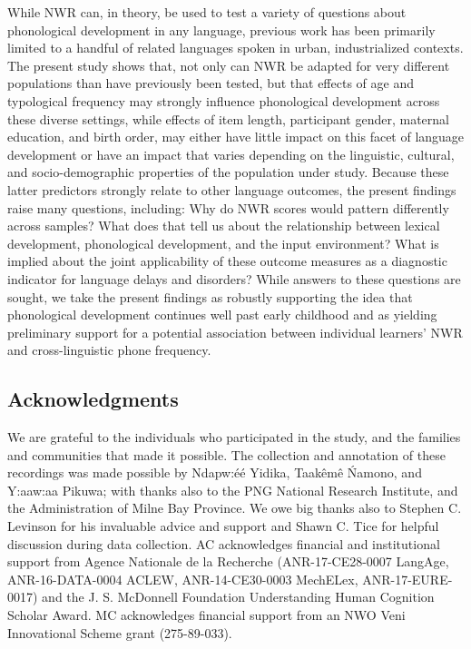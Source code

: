 \documentclass[english,,man,floatsintext]{apa6}
\begin{document}
While NWR can, in theory, be used to test a variety of questions about phonological development in any language, previous work has been primarily limited to a handful of related languages spoken in urban, industrialized contexts. The present study shows that, not only can NWR be adapted for very different populations than have previously been tested, but that effects of age and typological frequency may strongly influence phonological development across these diverse settings, while effects of item length, participant gender, maternal education, and birth order, may either have little impact on this facet of language development or have an impact that varies depending on the linguistic, cultural, and socio-demographic properties of the population under study. Because these latter predictors strongly relate to other language outcomes, the present findings raise many questions, including: Why do NWR scores would pattern differently across samples? What does that tell us about the relationship between lexical development, phonological development, and the input environment? What is implied about the joint applicability of these outcome measures as a diagnostic indicator for language delays and disorders? While answers to these questions are sought, we take the present findings as robustly supporting the idea that phonological development continues well past early childhood and as yielding preliminary support for a potential association between individual learners' NWR and cross-linguistic phone frequency.

\newpage

\hypertarget{acknowledgments}{%
\subsection{Acknowledgments}\label{acknowledgments}}

We are grateful to the individuals who participated in the study, and the families and communities that made it possible. The collection and annotation of these recordings was made possible by Ndapw:éé Yidika, Taakêmê Ńamono, and Y:aaw:aa Pikuwa; with thanks also to the PNG National Research Institute, and the Administration of Milne Bay Province. We owe big thanks also to Stephen C. Levinson for his invaluable advice and support and Shawn C. Tice for helpful discussion during data collection. AC acknowledges financial and institutional support from Agence Nationale de la Recherche (ANR-17-CE28-0007 LangAge, ANR-16-DATA-0004 ACLEW, ANR-14-CE30-0003 MechELex, ANR-17-EURE-0017) and the J. S. McDonnell Foundation Understanding Human Cognition Scholar Award. MC acknowledges financial support from an NWO Veni Innovational Scheme grant (275-89-033).
\end{document}
